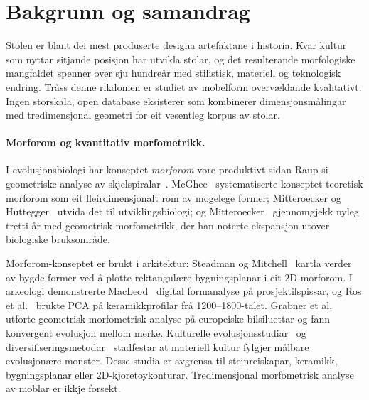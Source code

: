 \section{Bakgrunn og samandrag}

Stolen er blant dei mest produserte designa artefaktane i historia.
Kvar kultur som nyttar sitjande posisjon har utvikla stolar,
og det resulterande morfologiske mangfaldet spenner over sju hundre\aa r med stilistisk,
materiell og teknologisk endring.
Tr\aa ss denne rikdomen er studiet av mobelform overv\ae ldande kvalitativt.
Ingen storskala, open database eksisterer som kombinerer dimensjonsm\aa lingar
med tredimensjonal geometri for eit vesentleg korpus av stolar.

\paragraph{Morforom og kvantitativ morfometrikk.}
I evolusjonsbiologi har konseptet \emph{morforom}
vore produktivt sidan Raup si geometriske analyse av skjelspiralar~\cite{raup1966geometric}.
McGhee~\cite{mcghee1999morphology} systematiserte konseptet teoretisk morforom
som eit fleirdimensjonalt rom av mogelege former;
Mitteroecker og Huttegger~\cite{mitteroecher2009morphospace} utvida det til utviklingsbiologi;
og Mitteroecker~\cite{mitteroecker2022thirty} gjennomgjekk nyleg tretti \aa r
med geometrisk morfometrikk, der han noterte ekspansjon utover biologiske bruksomr\aa de.

Morforom-konseptet er brukt i arkitektur:
Steadman og Mitchell~\cite{steadman2010morphospace} kartla verder av bygde former
ved \aa{} plotte rektangul\ae re bygningsplanar i eit 2D-morforom.
I arkeologi demonstrerte MacLeod~\cite{macleod2018quantitative} digital formanalyse
p\aa{} prosjektilspissar, og Ros et al.~\cite{pottery2022morphometrics} brukte PCA
p\aa{} keramikkprofilar fr\aa{} 1200--1800-talet.
Grabner et al.~\cite{grabner2015automotive} utforte geometrisk morfometrisk analyse
p\aa{} europeiske bilsiluettar og fann konvergent evolusjon mellom merke.
Kulturelle evolusjonsstudiar~\cite{lycett2016cultural,mesoudi2011cultural,shennan2015cultural}
og diversifiseringsmetodar~\cite{kandler2019diversification}
stadfestar at materiell kultur fylgjer m\aa lbare evolusjon\ae re monster.
Desse studia er avgrensa til steinreiskapar, keramikk, bygningsplanar eller 2D-kjoretoykonturar.
Tredimensjonal morfometrisk analyse av moblar er ikkje forsekt.

